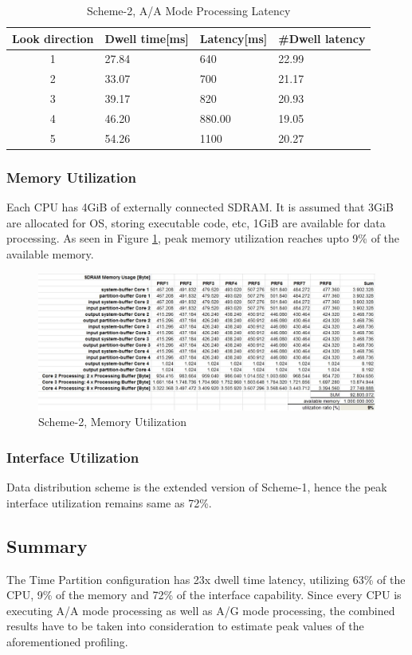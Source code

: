 \begin{table}[h!]
	\centering
	\begin{tabular}{|c|l|l|l|} 
	 \hline
	 \textbf{Look direction} & \textbf{Dwell time[ms]} & \textbf{Latency[ms]} & \textbf{\#Dwell latency} \\
	 \hline
	 1 & 27.84 & 640 & 22.99 \\ \hline
	 2 & 33.07 & 700 & 21.17 \\ \hline
	 3 & 39.17 & 820 & 20.93 \\ \hline
	 4 & 46.20 & 880.00 & 19.05 \\ \hline
	 5 & 54.26 & 1100 & 20.27 \\ \hline
	\end{tabular}
	\caption{Scheme-2, A/A Mode Processing Latency}
	\label{tbl:existing_analysis:aa_scheme2_latency}
\end{table}

\subsubsection{Memory Utilization}
\label{sss:scheme2:mem_util}
Each CPU has 4GiB of externally connected SDRAM. It is assumed that 3GiB are allocated for OS, storing executable code, etc, 1GiB are available for data processing. As seen in Figure \ref{fig:existing_analysis:scheme2_aa_mem_util}, peak memory utilization reaches upto 9\% of the available memory.

\begin{figure}[h!]
	\centering
	\includegraphics[width=160mm]{figures/scheme2_aa_mem_util}
	\caption{Scheme-2, Memory Utilization}
	\label{fig:existing_analysis:scheme2_aa_mem_util}
\end{figure}

\subsubsection{Interface Utilization}
\label{sss:scheme2:interface_util}
Data distribution scheme is the extended version of Scheme-1, hence the peak interface utilization remains same as 72\%.


\subsection{Summary}
\label{sss:scheme2:sar_summary}
The Time Partition configuration has 23x dwell time latency, utilizing 63\% of the CPU, 9\% of the memory and 72\% of the interface capability. Since every CPU is executing A/A mode processing as well as A/G mode processing, the combined results have to be taken into consideration to estimate peak values of the aforementioned profiling.

